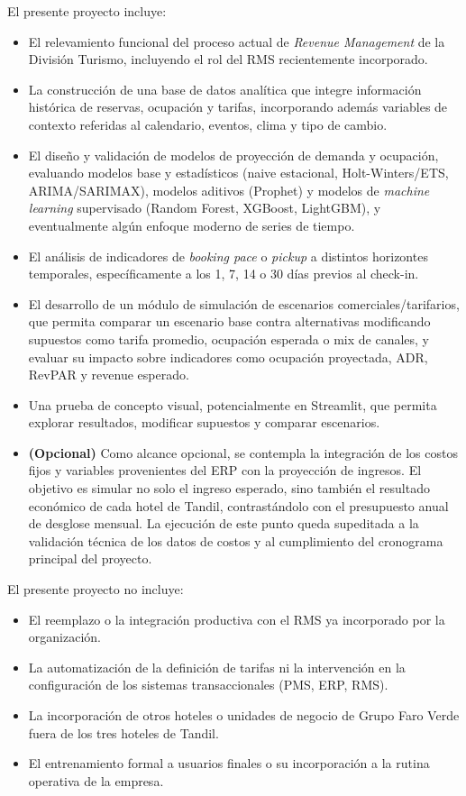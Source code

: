 \documentclass[
11pt, %
]{charter}
\begin{document}
El presente proyecto incluye:
\begin{itemize}
	\item El relevamiento funcional del proceso actual de \textit{Revenue Management} de la División Turismo, incluyendo el rol del RMS recientemente incorporado.
	\item La construcción de una base de datos analítica que integre información histórica de reservas, ocupación y tarifas, incorporando además variables de contexto referidas al calendario, eventos, clima y tipo de cambio.
	\item El diseño y validación de modelos de proyección de demanda y ocupación, evaluando modelos base y estadísticos (naive estacional, Holt-Winters/ETS, ARIMA/SARIMAX), modelos aditivos (Prophet) y modelos de \textit{machine learning} supervisado (Random Forest, XGBoost, LightGBM), y eventualmente algún enfoque moderno de series de tiempo.
	\item El análisis de indicadores de \textit{booking pace} o \textit{pickup} a distintos horizontes temporales, específicamente a los 1, 7, 14 o 30 días previos al check-in.
	\item El desarrollo de un módulo de simulación de escenarios comerciales/tarifarios, que permita comparar un escenario base contra alternativas modificando supuestos como tarifa promedio, ocupación esperada o mix de canales, y evaluar su impacto sobre indicadores como ocupación proyectada, ADR, RevPAR y revenue esperado.
	\item Una prueba de concepto visual, potencialmente en Streamlit, que permita explorar resultados, modificar supuestos y comparar escenarios.
	\item \textbf{(Opcional)} Como alcance opcional, se contempla la integración de los costos fijos y variables provenientes del ERP con la proyección de ingresos. El objetivo es simular no solo el ingreso esperado, sino también el resultado económico de cada hotel de Tandil, contrastándolo con el presupuesto anual de desglose mensual. La ejecución de este punto queda supeditada a la validación técnica de los datos de costos y al cumplimiento del cronograma principal del proyecto.
\end{itemize}


El presente proyecto no incluye:
\begin{itemize}
	\item El reemplazo o la integración productiva con el RMS ya incorporado por la organización.
	\item La automatización de la definición de tarifas ni la intervención en la configuración de los sistemas transaccionales (PMS, ERP, RMS).
	\item La incorporación de otros hoteles o unidades de negocio de Grupo Faro Verde fuera de los tres hoteles de Tandil.
	\item El entrenamiento formal a usuarios finales o su incorporación a la rutina operativa de la empresa.
\end{itemize}
\end{document}
